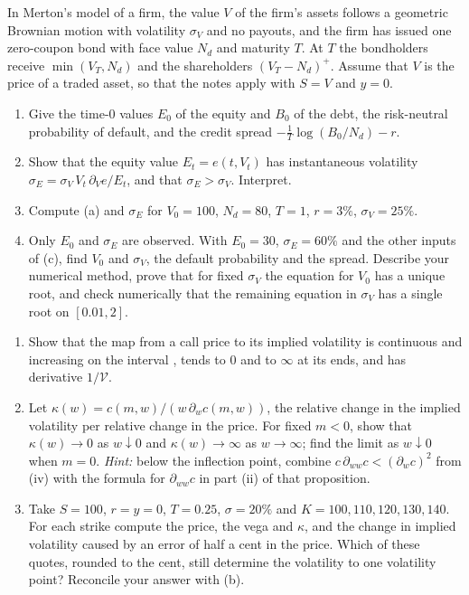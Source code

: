 \begin{exercise}\label{ex:bsf-merton}
\medium In Merton's model of a firm, the value $V$ of the firm's assets follows a geometric Brownian
motion with volatility $\sigma_V$ and no payouts, and the firm has issued one zero-coupon bond with face value
$N_d$ and maturity $T$. At $T$ the bondholders receive $\min(V_T,N_d)$ and the shareholders $(V_T-N_d)^+$.
Assume that $V$ is the price of a traded asset, so that the notes apply with $S=V$ and $y=0$.
\begin{enumerate}[label=(\alph*)]
  \item Give the time-$0$ values $E_0$ of the equity and $B_0$ of the debt, the risk-neutral probability of
    default, and the credit spread $-\frac1T\log(B_0/N_d)-r$.
  \item Show that the equity value $E_t=e(t,V_t)$ has instantaneous volatility
    $\sigma_E=\sigma_V\,V_t\,\partial_Ve/E_t$, and that $\sigma_E>\sigma_V$. Interpret.
  \item Compute (a) and $\sigma_E$ for $V_0=100$, $N_d=80$, $T=1$, $r=3\%$, $\sigma_V=25\%$.
  \item Only $E_0$ and $\sigma_E$ are observed. With $E_0=30$, $\sigma_E=60\%$ and the other inputs of (c),
    find $V_0$ and $\sigma_V$, the default probability and the spread. Describe your numerical method, prove
    that for fixed $\sigma_V$ the equation for $V_0$ has a unique root, and check numerically that the remaining
    equation in $\sigma_V$ has a single root on $[0.01,2]$.
\end{enumerate}
\end{exercise}

\begin{exercise}\label{ex:bsf-conditioning}
\medium
\begin{enumerate}[label=(\alph*)]
  \item Show that the map from a call price to its implied volatility is continuous and increasing on the
    interval , tends to $0$ and to $\infty$ at its ends, and has derivative
    $1/\mathcal V$.
  \item Let $\kappa(w)=c(m,w)/(w\,\partial_wc(m,w))$, the relative change in the implied volatility per
    relative change in the price. For fixed $m<0$, show that $\kappa(w)\to0$ as $w\downarrow0$ and
    $\kappa(w)\to\infty$ as $w\to\infty$; find the limit as $w\downarrow0$ when $m=0$. \emph{Hint:} below the
    inflection point, combine $c\,\partial_{ww}c<(\partial_wc)^2$ from (iv) with the formula for
    $\partial_{ww}c$ in part (ii) of that proposition.
  \item Take $S=100$, $r=y=0$, $T=0.25$, $\sigma=20\%$ and $K=100,110,120,130,140$. For each strike compute
    the price, the vega and $\kappa$, and the change in implied volatility caused by an error of half a cent
    in the price. Which of these quotes, rounded to the cent, still determine the volatility to one
    volatility point? Reconcile your answer with (b).
\end{enumerate}
\end{exercise}

